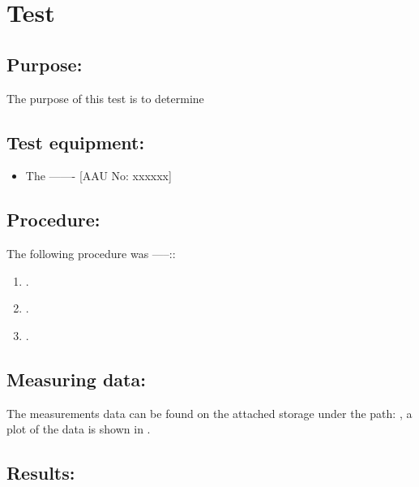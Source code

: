 \section{Test}
\label{test}

\subsection*{Purpose:}
The purpose of this test is to determine 


\subsection*{Test equipment:}
\begin{itemize}
\item The ------- [AAU No: xxxxxx]
\end{itemize}

\subsection*{Procedure:}
The following procedure was -----::
\begin{enumerate}
\item .
\item . 
\item .
\end{enumerate}


\subsection*{Measuring data:}
The measurements data can be found on the attached storage under the path: , a plot of the data is shown in .

\subsection*{Results:}

